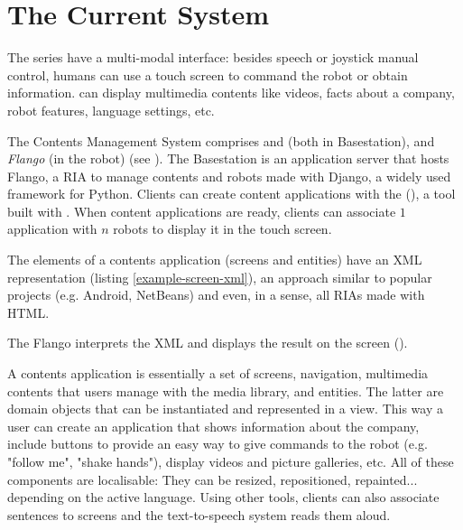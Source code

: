 \section{The Current System}
The  series have a multi-modal interface: besides speech or joystick manual control, humans can use a touch screen to command the robot or obtain information.
 can display multimedia contents like videos, facts about a company, robot features, language settings, etc.

The Contents Management System comprises \emph{\flangofe} and \emph{\flangobe} (both in Basestation), and \emph{Flango \cm} (in the robot) (see ).
The Basestation is an application server that hosts Flango, a \ac{RIA} to manage contents and robots made with Django, a widely used framework for Python. 
Clients can create content applications  with the \flangofe (\se), a tool built with \flash .
When content applications are ready, clients can associate $1$ application with $n$ robots to display it in the touch screen.



The elements of a contents application (screens and entities) have an \ac{XML} representation (listing \ref{example-screen-xml}), an approach similar to popular projects (e.g. Android, NetBeans) and even, in a sense, all \acp{RIA} made with \ac{HTML}.

The Flango \cm interprets the \ac{XML} and displays the result on the screen ().

A contents application is essentially a set of screens, navigation, multimedia contents that users manage with the media library, and entities. 
The latter are domain objects that can be instantiated and represented in a view. 
This way a user can create an application that shows information about the company, include buttons to provide an easy way to give commands to the robot (e.g. "follow me", "shake hands"), display videos and picture galleries, etc.
All of these components are localisable:  
They can be resized, repositioned, repainted... depending on the active language.
Using other tools, clients can also associate sentences to screens and the text-to-speech system reads them aloud.


